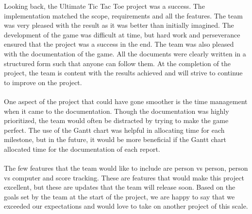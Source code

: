 \documentclass{article}
\begin{document}
Looking back, the Ultimate Tic Tac Toe project was a success. The implementation matched
the scope, requirements and all the features. The team was very pleased with the result as it was better
than initially imagined. The development of the game was difficult at time, but hard work and
perseverance ensured that the project was a success in the end. The team was also pleased with the
documentation of the game. All the documents were clearly written in a structured form such that anyone
can follow them. At the completion of the project, the team is content with the results achieved and will
strive to continue to improve on the project.\\\\
One aspect of the project that could have gone smoother is the time management when it came
to the documentation. Though the documentation was highly prioritized, the team would often be
distracted by trying to make the game perfect. The use of the Gantt chart was helpful in allocating time for each milestone, but in the future, it would be more beneficial if the Gantt chart allocated time for the 
documentation of each report.\\\\
The few features that the team would like to include are person vs person, person vs computer
and score tracking. These are features that would make this project excellent, but these are updates 
that the team will release soon. Based on the goals set by the team at the start of the project, we
are happy to say that we exceeded our expectations and would love to take on another project 
of this scale.
\end{document}
